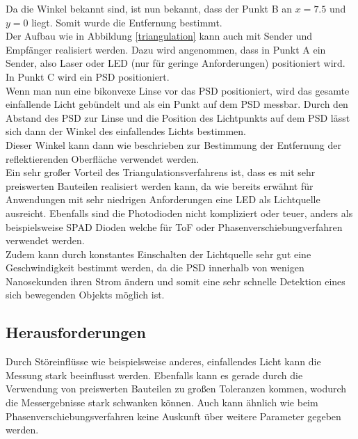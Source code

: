Da die Winkel bekannt sind, ist nun bekannt, dass der Punkt B an $x = 7.5$ und $y = 0$ liegt. Somit wurde die Entfernung bestimmt.\\
Der Aufbau wie in Abbildung \ref{triangulation} kann auch mit Sender und Empfänger realisiert werden. Dazu wird angenommen, dass in Punkt A ein Sender, also Laser oder \ac{LED} (nur für geringe Anforderungen) positioniert wird. In Punkt C wird ein \ac{PSD} positioniert.\\
Wenn man nun eine bikonvexe Linse vor das \ac{PSD} positioniert, wird das gesamte einfallende Licht gebündelt und als ein Punkt auf dem \ac{PSD} messbar.
Durch den Abstand des \ac{PSD} zur Linse und die Position des Lichtpunkts auf dem \ac{PSD} lässt sich dann der Winkel des einfallendes Lichts bestimmen.\\
Dieser Winkel kann dann wie beschrieben zur Bestimmung der Entfernung der reflektierenden Oberfläche verwendet werden. \\
Ein sehr großer Vorteil des Triangulationsverfahrens ist, dass es mit sehr preiswerten Bauteilen realisiert werden kann, da wie bereits erwähnt für Anwendungen mit sehr niedrigen Anforderungen eine \ac{LED} als Lichtquelle ausreicht. Ebenfalls sind die Photodioden nicht kompliziert oder teuer, anders als beispielsweise \ac{SPAD} Dioden welche für \ac{ToF} oder Phasenverschiebungverfahren verwendet werden.\\
Zudem kann durch konstantes Einschalten der Lichtquelle sehr gut eine Geschwindigkeit bestimmt werden, da die \ac{PSD} innerhalb von wenigen Nanosekunden ihren Strom ändern und somit eine sehr schnelle Detektion eines sich bewegenden Objekts möglich ist. \cite{triangulation}\cite{psd}
\subsection{Herausforderungen}
Durch Störeinflüsse wie beispielsweise anderes, einfallendes Licht kann die Messung stark beeinflusst werden. Ebenfalls kann es gerade durch die Verwendung von preiswerten Bauteilen zu großen Toleranzen kommen, wodurch die Messergebnisse stark schwanken können. Auch kann ähnlich wie beim Phasenverschiebungsverfahren keine Auskunft über weitere Parameter gegeben werden. 
